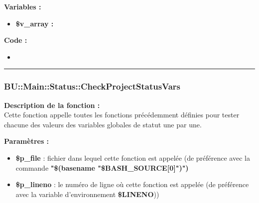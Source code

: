 \documentclass[a4paper,10pt]{article}
\begin{document}
\begin{justify}
    \textbf{Variables :}

    \begin{itemize}
        \item \textbf{\color{orange}\$v\_array\color{white} :}
    \end{itemize}
\end{justify}

\begin{justify}
    \textbf{Code :}
    
    \begin{itemize}
        \item \textbf{}
    \end{itemize}
\end{justify}



\color{blue}\par\noindent\rule{\textwidth}{0.4pt}\color{white}

\color{blue}
\subsubsection{\color{mauve}BU::Main::Status::CheckProjectStatusVars}\color{white}

\begin{justify}
    \textbf{Description de la fonction :}\\
    Cette fonction appelle toutes les fonctions précédemment définies pour tester chacune des valeurs des variables globales de statut une par une.
\end{justify}

\begin{justify}
    \textbf{Paramètres :}
    \begin{itemize}
        \item \color{orange}\textbf{\$p\_file}\color{white} : fichier dans lequel cette fonction est appelée (de préférence avec la commande \textbf{"\$(\color{gray}basename \color{white}"\color{orange}\$BASH\_SOURCE[0]\color{white}")")}\\

        \item \color{orange}\textbf{\$p\_lineno}\color{white} : le numéro de ligne où cette fonction est appelée (de préférence avec la variable d'environnement \textbf{\color{orange}\$LINENO}))
    \end{itemize}
\end{justify}
\end{document}
